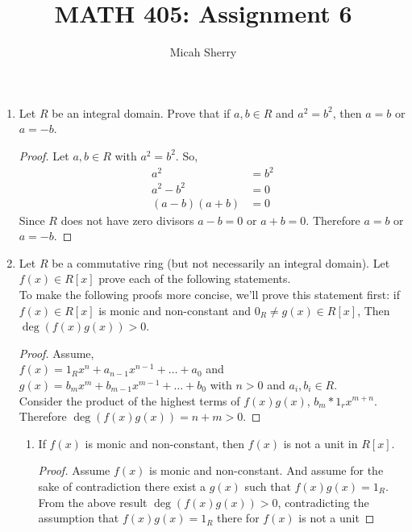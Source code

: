 \documentclass{article}
\title{MATH 405: Assignment 6}
\author{Micah Sherry}
\begin{document}
	\maketitle
	\begin{enumerate}
		\item Let $R$ be an integral domain. Prove that if $a, b \in R$ and $a^2 = b^2$, then $a = b$ or $a = -b$.
		\begin{proof}
		
			Let $a,b \in R$ with $a^2 = b^2$.
			So,
			\begin{align*}
				a^2 	   &= b^2\\
				a^2-b^2    &= 0\\
				(a-b)(a+b) &= 0
			\end{align*}  
			Since $R$ does not have zero divisors $a-b = 0$ or $a+b = 0$. Therefore $a = b$ or $a = -b$.
		\end{proof}



		\item Let $R$ be a commutative ring (but not necessarily an integral domain). 
		Let $f(x) \in R[x]$ prove each of the following statements. \\ 
		To make the following proofs more concise, we'll prove this statement first:
		if $f(x) \in R[x]$ is monic and non-constant and $0_R \not=g(x) \in R[x]$, Then $\deg(f(x)g(x))>0$.
		\begin{proof}
			Assume,\\$f(x) = 1_Rx^n+ a_{n-1}x^{n-1} + \ldots + a_0$ and\\
			$g(x) = b_mx^m+b_{m-1}x^{m-1} + \ldots + b_0$ with $n>0$ and $a_i, b_i \in R$.\\
			Consider the product of the highest terms of $f(x)g(x)$, $b_m*1_rx^{m+n}$.
			Therefore $\deg(f(x)g(x)) = n + m >0$.
		\end{proof}

		\begin{enumerate}
			\item If $f(x)$ is monic and non-constant, then $f(x)$ is not a unit in $R[x]$.
			\begin{proof}
				Assume $f(x)$ is monic and non-constant.
				And assume for the sake of contradiction there exist a $g(x)$ such that $f(x)g(x) = 1_R$. 
				From the above result $\deg(f(x)g(x))>0$, contradicting the assumption that $f(x)g(x) = 1_R$ 
				there for $f(x)$ is not a unit
			\end{proof} 


\end{enumerate}
\end{enumerate}
\end{document}
